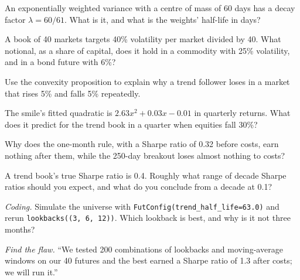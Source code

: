 \begin{exercise}[$\star$]\label{exo:s1:trend-following:1}
An exponentially weighted variance with a centre of mass of 60 days has a decay factor $\lambda = 60/61$. What is it, and what is the weights'
half-life in days?
\end{exercise}

\begin{exercise}[$\star$]\label{exo:s1:trend-following:2}
A book of 40 markets targets 40\% volatility per market divided by 40. What notional, as a share of capital, does it hold in a commodity with 25\%
volatility, and in a bond future with 6\%?
\end{exercise}

\begin{exercise}[$\star$]\label{exo:s1:trend-following:3}
Use the convexity proposition to explain why a trend follower loses in a market that rises 5\% and falls 5\% repeatedly.
\end{exercise}

\begin{exercise}[$\star\star$]\label{exo:s1:trend-following:4}
The smile's fitted quadratic is $2.63x^2 + 0.03x - 0.01$ in quarterly returns. What does it predict for the trend book in a quarter when equities fall
30\%?
\end{exercise}

\begin{exercise}[$\star\star$]\label{exo:s1:trend-following:5}
Why does the one-month rule, with a Sharpe ratio of 0.32 before costs, earn nothing after them, while the 250-day breakout loses almost nothing to costs?
\end{exercise}

\begin{exercise}[$\star\star$]\label{exo:s1:trend-following:6}
A trend book's true Sharpe ratio is 0.4. Roughly what range of decade Sharpe ratios should you expect, and what do you conclude from a decade at 0.1?
\end{exercise}

\begin{exercise}[$\star\star\star$]\label{exo:s1:trend-following:7}
\emph{Coding.} Simulate the universe with \texttt{FutConfig(trend\_half\_life=63.0)} and rerun \texttt{lookbacks((3, 6, 12))}. Which lookback is best,
and why is it not three months?
\end{exercise}

\begin{exercise}[$\star\star\star$]\label{exo:s1:trend-following:8}
\emph{Find the flaw.} ``We tested 200 combinations of lookbacks and moving-average windows on our 40 futures and the best earned a Sharpe ratio of 1.3
after costs; we will run it.''
\end{exercise}

